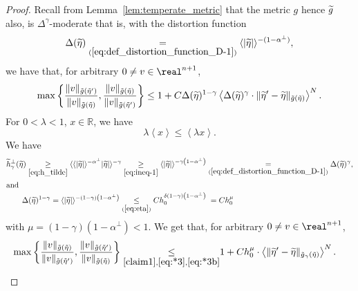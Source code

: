 \documentclass[10pt]{amsart}
\theoremstyle{definition}\newtheorem{defi}[theo]{Definition}\newtheorem{rema}[theo]{Remark}\newtheorem{exam}[theo]{Example}\newtheorem{exem}[theo]{Example}\newtheorem{nota}[theo]{Notation}
\newcommand*\eq[1]{\underset{(#1)}{=}}
\newcommand*\ineq[1]{\underset{(#1)}{\leq}}
\newcommand{\bbR}{\mathbb{R}}
\let\oldtilde\tilde
\renewcommand*{\tilde}[1]{\mathchoice{\widetilde{#1}}{\widetilde{#1}}{\oldtilde{#1}}{\oldtilde{#1}}}
\begin{document}
\begin{proof}
Recall from Lemma~\ref{lem:temperate_metric} that the metric $g$ hence $\tilde{g}$ also, is $\Delta^{\gamma}$-moderate that is, with the distortion function 
\[
\Delta(\tilde{\eta})\eq{\ref{eq:def_distortion_function_D-1}}\langle|\tilde{\eta}|\rangle^{-(1-\alpha^{\perp})},
\]
we have that, for arbitrary $0\neq v\in\real^{n+1}$,
\begin{equation}\label{claim1}
\max\left\{ \frac{\|v\|_{\tilde{g}\left(\tilde{\eta}'\right)}}{\|v\|_{\tilde{g}\left(\tilde{\eta}\right)}},\frac{\|v\|_{\tilde{g}\left(\tilde{\eta}\right)}}{\|v\|_{\tilde{g}\left(\tilde{\eta}'\right)}}\right\} \le1+C\Delta(\tilde{\eta})^{1-\gamma}\left\langle \Delta(\tilde{\eta})^{\gamma}\cdot\|\tilde{\eta}'-\tilde{\eta}\|_{\tilde{g}\left(\tilde{\eta}\right)}\right\rangle ^{N}.
\end{equation}
For $0<\lambda<1$, $x\in\bbR$, we have
\begin{equation}\label{eq:ineq-1}
\lambda\left\langle x\right\rangle \leq\left\langle \lambda x\right\rangle.
\end{equation}
We have
\begin{align}
\tilde{h}_{\gamma}^{\perp}(\tilde{\eta})\underset{\eqref{eq:h_tilde}}{\geq}\langle\langle|\tilde{\eta}|\rangle^{-\alpha^{\perp}}|\tilde{\eta}|\rangle^{-\gamma}\underset{\eqref{eq:ineq-1}}{\geq}\langle|\tilde{\eta}|\rangle^{-\gamma\left(1-\alpha^{\perp}\right)}&\eq{\ref{eq:def_distortion_function_D-1}}\Delta(\tilde{\eta})^{\gamma},\label{eq:*3}
\\
\intertext{and}
\Delta(\tilde{\eta})^{1-\gamma}=\langle|\tilde{\eta}|\rangle^{-\left(1-\gamma\right)\left(1-\alpha^{\perp}\right)}\ineq{\ref{eq:eta}}Ch_{0}^{\delta\left(1-\gamma\right)\left(1-\alpha^{\perp}\right)} &\mkern5mu =Ch_{0}^{\mu}\label{eq:*3b}
\end{align}
with $\mu=(1-\gamma)(1-\alpha^{\perp})<1$. We get that, for arbitrary $0\neq v\in\real^{n+1}$,
\begin{align}\label{claim3}
\max\left\{ \frac{\|v\|_{\tilde{g}\left(\tilde{\eta}\right)}}{\|v\|_{\tilde{g}\left(\tilde{\eta}'\right)}},\frac{\|v\|_{\tilde{g}\left(\tilde{\eta}'\right)}}{\|v\|_{\tilde{g}\left(\tilde{\eta}\right)}}\right\} \underset{\eqref{claim1},\eqref{eq:*3},\eqref{eq:*3b}}{\leq} & 1+Ch_{0}^{\mu}\cdot\left\langle \|\tilde{\eta}'-\tilde{\eta}\|_{\tilde{g}_{\gamma}\left(\tilde{\eta}\right)}\right\rangle ^{N}.
\end{align}


\end{proof}
\end{document}
